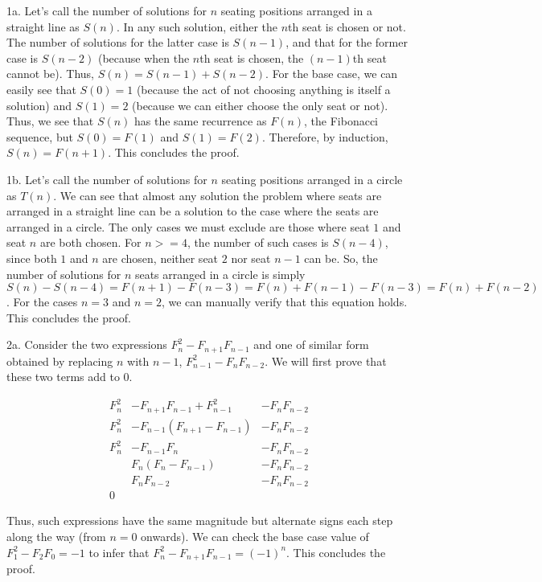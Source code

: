 \documentclass{article}
\begin{document}
1a. Let's call the number of solutions for $n$ seating positions arranged in a straight line as $S(n)$. In any such solution, either the $n$th seat is chosen or not. The number of solutions for the latter case is $S(n - 1)$, and that for the former case is $S(n - 2)$ (because when the $n$th seat is chosen, the $(n - 1)$th seat cannot be). Thus, $S(n) = S(n - 1) + S(n - 2)$. For the base case, we can easily see that $S(0) = 1$ (because the act of not choosing anything is itself a solution) and $S(1) = 2$ (because we can either choose the only seat or not). Thus, we see that $S(n)$ has the same recurrence as $F(n)$, the Fibonacci sequence, but $S(0) = F(1)$ and $S(1) = F(2)$. Therefore, by induction, $S(n) = F(n + 1)$. This concludes the proof.

1b. Let's call the number of solutions for $n$ seating positions arranged in a circle as $T(n)$. We can see that almost any solution the problem where seats are arranged in a straight line can be a solution to the case where the seats are arranged in a circle. The only cases we must exclude are those where seat $1$ and seat $n$ are both chosen. For $n >= 4$, the number of such cases is $S(n - 4)$, since both $1$ and $n$ are chosen, neither seat $2$ nor seat $n - 1$ can be. So, the number of solutions for $n$ seats arranged in a circle is simply $S(n) - S(n - 4) = F(n + 1) - F(n - 3) = F(n) + F(n - 1) - F(n - 3) = F(n) + F(n - 2)$. For the cases $n = 3$ and $n = 2$, we can manually verify that this equation holds. This concludes the proof.

2a. Consider the two expressions $F_n^2 - F_{n + 1}F_{n - 1}$ and one of similar form obtained by replacing $n$ with $n - 1$, $F_{n - 1}^2 - F_nF_{n - 2}$. We will first prove that these two terms add to $0$.

\begin{align*}
    F_n^2 &- F_{n + 1}F_{n - 1} + F_{n - 1}^2 &- F_nF_{n - 2} \\
    F_n^2 &- F_{n - 1}(F_{n + 1} - F_{n - 1}) &- F_nF_{n - 2} \\
    F_n^2 &- F_{n - 1}F_n &- F_nF_{n - 2} \\
    &F_n(F_n - F_{n - 1}) &- F_nF_{n - 2} \\
    &F_nF_{n - 2} &- F_nF_{n - 2} \\
    0
\end{align*}

Thus, such expressions have the same magnitude but alternate signs each step along the way (from $n = 0$ onwards). We can check the base case value of $F_1^2 - F_2F_0 = -1$ to infer that $F_n^2 - F_{n + 1}F_{n - 1} = (-1)^n$. This concludes the proof.
\end{document}
